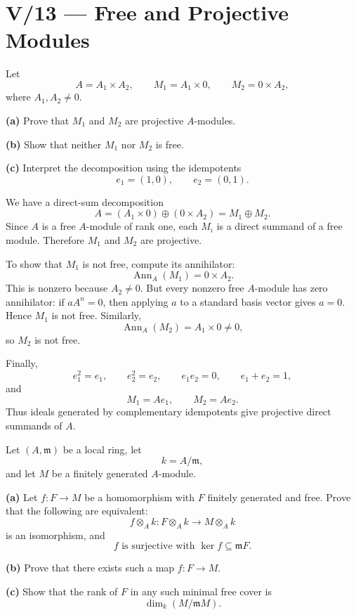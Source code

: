 \section*{V/13 --- Free and Projective Modules}

\begin{problem}[CP-V-0020]
\label{prob:cp-v-0020}
Let
\[
A=A_1\times A_2,
\qquad
M_1=A_1\times0,
\qquad
M_2=0\times A_2,
\]
where \(A_1,A_2\ne0\).

\textbf{(a)} Prove that \(M_1\) and \(M_2\) are projective \(A\)-modules.

\textbf{(b)} Show that neither \(M_1\) nor \(M_2\) is free.

\textbf{(c)} Interpret the decomposition using the idempotents
\[
e_1=(1,0),\qquad e_2=(0,1).
\]
\end{problem}

\begin{solution}
We have a direct-sum decomposition
\[
A=(A_1\times0)\oplus(0\times A_2)=M_1\oplus M_2.
\]
Since \(A\) is a free \(A\)-module of rank one, each \(M_i\) is a direct
summand of a free module. Therefore \(M_1\) and \(M_2\) are projective.

To show that \(M_1\) is not free, compute its annihilator:
\[
\operatorname{Ann}_A(M_1)=0\times A_2.
\]
This is nonzero because \(A_2\ne0\). But every nonzero free \(A\)-module has
zero annihilator: if \(aA^n=0\), then applying \(a\) to a standard basis
vector gives \(a=0\). Hence \(M_1\) is not free. Similarly,
\[
\operatorname{Ann}_A(M_2)=A_1\times0\ne0,
\]
so \(M_2\) is not free.

Finally,
\[
e_1^2=e_1,\qquad e_2^2=e_2,\qquad e_1e_2=0,\qquad e_1+e_2=1,
\]
and
\[
M_1=Ae_1,\qquad M_2=Ae_2.
\]
Thus ideals generated by complementary idempotents give projective direct
summands of \(A\).
\end{solution}


\begin{problem}[CP-V-0021]
\label{prob:cp-v-0021}
Let \((A,\mathfrak m)\) be a local ring, let
\[
k=A/\mathfrak m,
\]
and let \(M\) be a finitely generated \(A\)-module.

\textbf{(a)} Let \(f:F\to M\) be a homomorphism with \(F\) finitely generated
and free. Prove that the following are equivalent:
\[
f\otimes_A k:F\otimes_A k\longrightarrow M\otimes_A k
\]
is an isomorphism, and
\[
f\text{ is surjective with }\ker f\subseteq\mathfrak m F.
\]

\textbf{(b)} Prove that there exists such a map \(f:F\to M\).

\textbf{(c)} Show that the rank of \(F\) in any such minimal free cover is
\[
\dim_k(M/\mathfrak mM).
\]
\end{problem}

